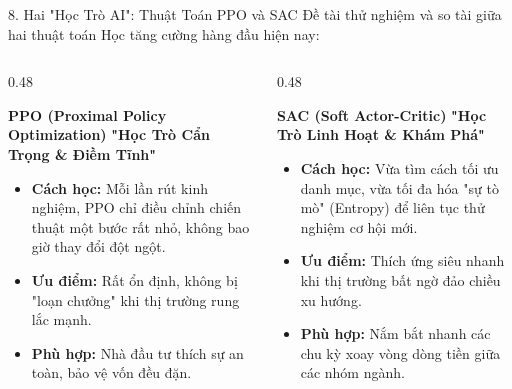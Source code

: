 \documentclass[aspectratio=169, 10pt]{beamer}
\begin{document}
\begin{frame}{8. Hai "Học Trò AI": Thuật Toán PPO và SAC}
  Đề tài thử nghiệm và so tài giữa hai thuật toán Học tăng cường hàng đầu hiện nay:

  \vspace{1ex}
  \begin{columns}[t]
    \begin{column}{0.48\textwidth}
      \begin{block}{\textbf{PPO (Proximal Policy Optimization)}}
        \centering
        {\large \color{AccentCyan}\textbf{"Học Trò Cẩn Trọng \& Điềm Tĩnh"}}
        \vspace{0.8ex}
        \begin{itemize}
          \item \textbf{Cách học:} Mỗi lần rút kinh nghiệm, PPO chỉ điều chỉnh chiến thuật một bước rất nhỏ, không bao giờ thay đổi đột ngột.
          \item \textbf{Ưu điểm:} Rất ổn định, không bị "loạn chưởng" khi thị trường rung lắc mạnh.
          \item \textbf{Phù hợp:} Nhà đầu tư thích sự an toàn, bảo vệ vốn đều đặn.
        \end{itemize}
      \end{block}
    \end{column}

    \begin{column}{0.48\textwidth}
      \begin{block}{\textbf{SAC (Soft Actor-Critic)}}
        \centering
        {\large \color{SuccessGreen}\textbf{"Học Trò Linh Hoạt \& Khám Phá"}}
        \vspace{0.8ex}
        \begin{itemize}
          \item \textbf{Cách học:} Vừa tìm cách tối ưu danh mục, vừa tối đa hóa "sự tò mò" (Entropy) để liên tục thử nghiệm cơ hội mới.
          \item \textbf{Ưu điểm:} Thích ứng siêu nhanh khi thị trường bất ngờ đảo chiều xu hướng.
          \item \textbf{Phù hợp:} Nắm bắt nhanh các chu kỳ xoay vòng dòng tiền giữa các nhóm ngành.
        \end{itemize}
      \end{block}
    \end{column}
  \end{columns}
\end{frame}
\end{document}
